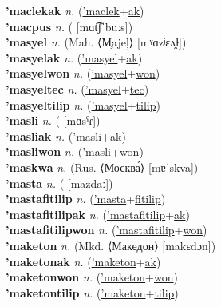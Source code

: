 \textbf{'maclekak} \textit{n.} (\hyperref['maclek]{'maclek}+\hyperref[ak]{ak})
 \label{'maclekak} \\
\textbf{'macpus} \textit{n.} ( [mɑt͡ʃˈbuːs])
 \label{'macpus} \\
\textbf{'masyel} \textit{n.} (Mah. ⟨M̧ajeļ⟩ [mˠɑzʲɛʌ̯ɫ])
 \label{'masyel} \\
\textbf{'masyelak} \textit{n.} (\hyperref['masyel]{'masyel}+\hyperref[ak]{ak})
 \label{'masyelak} \\
\textbf{'masyelwon} \textit{n.} (\hyperref['masyel]{'masyel}+\hyperref[won]{won})
 \label{'masyelwon} \\
\textbf{'masyeltec} \textit{n.} (\hyperref['masyel]{'masyel}+\hyperref[tec]{tec})
 \label{'masyeltec} \\
\textbf{'masyeltilip} \textit{n.} (\hyperref['masyel]{'masyel}+\hyperref[tilip]{tilip})
 \label{'masyeltilip} \\
\textbf{'masli} \textit{n.} ( [mɑsˁɾ])
 \label{'masli} \\
\textbf{'masliak} \textit{n.} (\hyperref['masli]{'masli}+\hyperref[ak]{ak})
 \label{'masliak} \\
\textbf{'masliwon} \textit{n.} (\hyperref['masli]{'masli}+\hyperref[won]{won})
 \label{'masliwon} \\
\textbf{'maskwa} \textit{n.} (Rus. ⟨Москва́⟩ [mɐˈskva])
 \label{'maskwa} \\
\textbf{'masta} \textit{n.} ( [mazdaː])
 \label{'masta} \\
\textbf{'mastafitilip} \textit{n.} (\hyperref['masta]{'masta}+\hyperref[fitilip]{fitilip})
 \label{'mastafitilip} \\
\textbf{'mastafitilipak} \textit{n.} (\hyperref['mastafitilip]{'mastafitilip}+\hyperref[ak]{ak})
 \label{'mastafitilipak} \\
\textbf{'mastafitilipwon} \textit{n.} (\hyperref['mastafitilip]{'mastafitilip}+\hyperref[won]{won})
 \label{'mastafitilipwon} \\
\textbf{'maketon} \textit{n.} (Mkd. ⟨Македон⟩ [makɛdɔn])
 \label{'maketon} \\
\textbf{'maketonak} \textit{n.} (\hyperref['maketon]{'maketon}+\hyperref[ak]{ak})
 \label{'maketonak} \\
\textbf{'maketonwon} \textit{n.} (\hyperref['maketon]{'maketon}+\hyperref[won]{won})
 \label{'maketonwon} \\
\textbf{'maketontilip} \textit{n.} (\hyperref['maketon]{'maketon}+\hyperref[tilip]{tilip})
 \label{'maketontilip} \\
